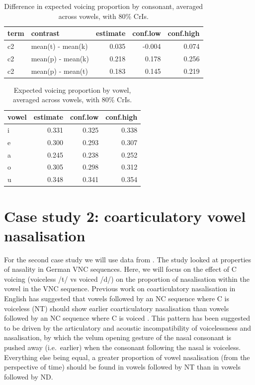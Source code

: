 \documentclass[
  authoryear,
  preprint,
  3p]{elsarticle}
\begin{document}
\begin{longtable}[]{@{}llrrr@{}}

\caption{\label{tbl-marginal-1}Difference in expected voicing proportion
by consonant, averaged across vowels, with 80\% CrIs.}

\tabularnewline

\toprule\noalign{}
term & contrast & estimate & conf.low & conf.high \\
\midrule\noalign{}
\endhead
\bottomrule\noalign{}
\endlastfoot
c2 & mean(t) - mean(k) & 0.035 & -0.004 & 0.074 \\
c2 & mean(p) - mean(k) & 0.218 & 0.178 & 0.256 \\
c2 & mean(p) - mean(t) & 0.183 & 0.145 & 0.219 \\

\end{longtable}

\begin{longtable}[]{@{}lrrr@{}}

\caption{\label{tbl-marginal-2}Expected voicing proportion by vowel,
averaged across vowels, with 80\% CrIs.}

\tabularnewline

\toprule\noalign{}
vowel & estimate & conf.low & conf.high \\
\midrule\noalign{}
\endhead
\bottomrule\noalign{}
\endlastfoot
i & 0.331 & 0.325 & 0.338 \\
e & 0.300 & 0.293 & 0.307 \\
a & 0.245 & 0.238 & 0.252 \\
o & 0.305 & 0.298 & 0.312 \\
u & 0.348 & 0.341 & 0.354 \\

\end{longtable}

\section{Case study 2: coarticulatory vowel
nasalisation}\label{sec-case-2}

For the second case study we will use data from \citet{carignan2021}.
The study looked at properties of nasality in German VNC sequences.
Here, we will focus on the effect of C voicing (voiceless /t/ vs voiced
/d/) on the proportion of nasalisation within the vowel in the VNC
sequence. Previous work on coarticulatory nasalisation in English has
suggested that vowels followed by an NC sequence where C is voiceless
(NT) should show earlier coarticulatory nasalisation than vowels
followed by an NC sequence where C is voiced \citep[ND, see review
in][]{carignan2021}. This pattern has been suggested to be driven by the
articulatory and acoustic incompatibility of voicelessness and
nasalisation, by which the velum opening gesture of the nasal consonant
is pushed away (i.e.~earlier) when the consonant following the nasal is
voiceless. Everything else being equal, a greater proportion of vowel
nasalisation (from the perspective of time) should be found in vowels
followed by NT than in vowels followed by ND.
\end{document}
